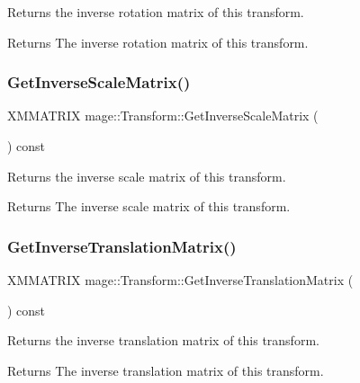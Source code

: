 Returns the inverse rotation matrix of this transform.

\begin{DoxyReturn}{Returns}
The inverse rotation matrix of this transform. 
\end{DoxyReturn}
\hypertarget{structmage_1_1_transform_a31da6a53e73a6254bc36cd0348c65cda}{}\label{structmage_1_1_transform_a31da6a53e73a6254bc36cd0348c65cda} 
\subsubsection{\texorpdfstring{Get\+Inverse\+Scale\+Matrix()}{GetInverseScaleMatrix()}}
{\footnotesize\ttfamily X\+M\+M\+A\+T\+R\+IX mage\+::\+Transform\+::\+Get\+Inverse\+Scale\+Matrix (\begin{DoxyParamCaption}{ }\end{DoxyParamCaption}) const\hspace{0.3cm}{\ttfamily [private]}}

Returns the inverse scale matrix of this transform.

\begin{DoxyReturn}{Returns}
The inverse scale matrix of this transform. 
\end{DoxyReturn}
\hypertarget{structmage_1_1_transform_a4cd7f7143c49772a83adfbd1d75dd475}{}\label{structmage_1_1_transform_a4cd7f7143c49772a83adfbd1d75dd475} 
\subsubsection{\texorpdfstring{Get\+Inverse\+Translation\+Matrix()}{GetInverseTranslationMatrix()}}
{\footnotesize\ttfamily X\+M\+M\+A\+T\+R\+IX mage\+::\+Transform\+::\+Get\+Inverse\+Translation\+Matrix (\begin{DoxyParamCaption}{ }\end{DoxyParamCaption}) const\hspace{0.3cm}{\ttfamily [private]}}

Returns the inverse translation matrix of this transform.

\begin{DoxyReturn}{Returns}
The inverse translation matrix of this transform. 
\end{DoxyReturn}
\hypertarget{structmage_1_1_transform_a9374ee1896e1006b81e7643a1c1dc967}{}\label{structmage_1_1_transform_a9374ee1896e1006b81e7643a1c1dc967} 
